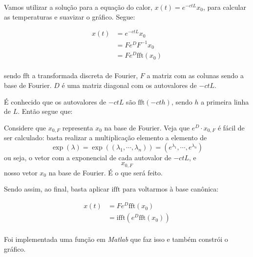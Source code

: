 \documentclass{article}
\begin{document}
\begin{enumerate}
\begin{enumerate}
                        Vamos utilizar a solução para a equação do calor,
                        $x(t) = e^{-c t L} x_0$, para calcular as temperaturas
                        e suavizar o gráfico. Segue:

                        \begin{align*}
                            x(t) &= e^{-c t L} x_0 \\
                            &= F e^{D} F^{-1} x_0 \\
                            &= F e^{D} \textrm{fft}(x_0) \\
                        \end{align*}

                        sendo $\textrm{fft}$ a transformada discreta de Fourier,
                        $F$ a matriz com as colunas sendo a base de Fourier.
                        $D$ é uma matriz diagonal com os autovalores de
                        $-ctL$.

                        É conhecido que os autovalores de $-ctL$ são $\textrm{fft}(-cth)$,
                        sendo $h$ a primeira linha de $L$. Então segue que:

                        Considere que $x_{0,F}$ representa $x_0$ na base de Fourier.
                        Veja que $e^D \cdot x_{0, F}$ é fácil de ser calculado:
                        basta realizar a multiplicação elemento a elemento de
                        $$\exp(\lambda) = \exp((\lambda_1, \cdots, \lambda_n)) = \left(e^{\lambda_1}, \cdots, e^{\lambda_n}\right)$$
                        ou seja, o vetor com a exponencial de cada autovalor de $-ctL$, e
                        $$x_{0, F}$$
                        nosso vetor $x_0$ na base de Fourier. É o que será feito.

                        Sendo assim, ao final, basta aplicar $\textrm{ifft}$ para voltarmos
                        à base canônica:

                        \begin{align*}
                            x(t) &= F e^{D} \textrm{fft}(x_0) \\
                            &= \textrm{ifft}\left(e^{D} \textrm{fft}(x_0)\right) \\
                        \end{align*}

                        Foi implementada uma função em \textit{Matlab} que faz isso e
                        também constrói o gráfico.

                \end{enumerate}
        \end{enumerate}
\end{document}
